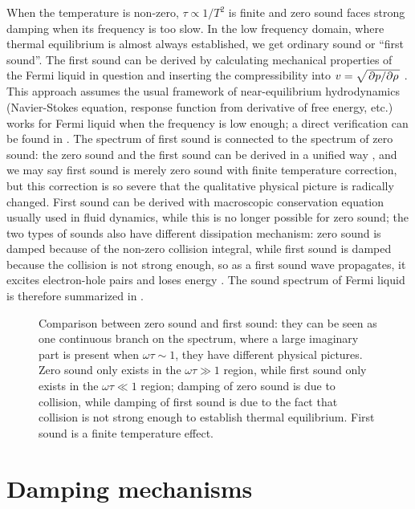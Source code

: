\documentclass[hyperref, a4paper]{article}
\begin{document}
When the temperature is non-zero,
$\tau \propto 1 / T^2$ is finite 
and zero sound faces strong damping 
when its frequency is too slow.
In the low frequency domain, 
where thermal equilibrium is almost always established,
we get ordinary sound or ``first sound''.
The first sound can be derived 
by calculating mechanical properties of the Fermi liquid in question 
and inserting the compressibility 
into $v = \sqrt{\pdv*{p}{\rho}}$ \cite{lifshitz2013statistical}.
This approach assumes the usual framework of near-equilibrium hydrodynamics 
(Navier-Stokes equation, response function from derivative of free energy, etc.)
works for Fermi liquid when the frequency is low enough; 
a direct verification can be found in \cite{belitz2022soft}.
The spectrum of first sound 
is connected to the spectrum of zero sound:
the zero sound and the first sound can be derived 
in a unified way \cite{khalatnikov1958dispersion},
and we may say first sound is 
merely zero sound with finite temperature correction, 
but this correction is so severe that the qualitative physical picture 
is radically changed.
First sound can be derived with macroscopic conservation equation 
usually used in fluid dynamics,
while this is no longer possible for zero sound;
the two types of sounds also have different dissipation mechanism:
zero sound is damped because of the non-zero collision integral,
while first sound is damped because the collision is not strong enough,
so as a first sound wave propagates,
it excites electron-hole pairs 
and loses energy
\cite{abel1966propagation,belitz2022soft}. 
The sound spectrum of Fermi liquid is therefore summarized in .

\begin{figure}
    \centering
    
    \caption{Comparison between zero sound and first sound: 
    they can be seen as one continuous branch 
    on the spectrum, 
    where a large imaginary part is present when $\omega \tau \sim 1$,
    they have different physical pictures.
    Zero sound only exists in the $\omega \tau \gg 1$ region,
    while first sound only exists in the $\omega \tau \ll 1$ region;
    damping of zero sound is due to collision,
    while damping of first sound is due to the fact that
    collision is not strong enough to establish thermal equilibrium.
    First sound is a finite temperature effect.}
    \label{fig:sound-comparison}
\end{figure}

\section{Damping mechanisms}
\end{document}
